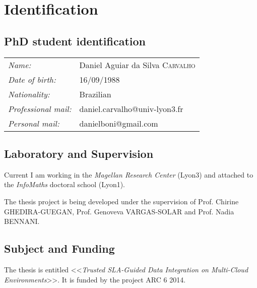 \chapter{Identification}
\label{chap:identification}
\minitoc

\section{PhD student identification}
\begin{flushleft}
\begin{tabular}{ll}
\textit{Name:} & Daniel Aguiar da Silva \textsc{Carvalho}\\
\textit{Date of birth:} & 16/09/1988\\
\textit{Nationality:} & Brazilian\\
\textit{Professional mail:} & daniel.carvalho@univ-lyon3.fr\\
\textit{Personal mail:} & danielboni@gmail.com\\
\end{tabular}
\end{flushleft}

\section{Laboratory and Supervision}
Current I am working in the \textit{Magellan Research Center} (Lyon3) and attached to the \textit{InfoMaths} doctoral school (Lyon1).

\bigskip
\noindent The thesis project is being developed under the supervision of Prof. Chirine GHEDIRA-GUEGAN, Prof. Genoveva VARGAS-SOLAR and Prof. Nadia BENNANI.

\section{Subject and Funding}

The thesis is entitled <<\textsl{Trusted SLA-Guided Data Integration on Multi-Cloud Environments}>>. It is funded by the project ARC 6 2014. 
